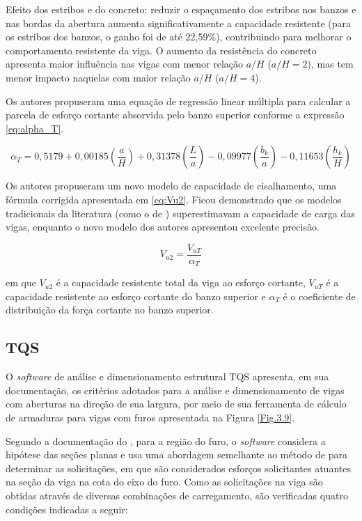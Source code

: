 Efeito dos estribos e do concreto: reduzir o espaçamento dos estribos nos banzos e nas bordas da abertura aumenta significativamente a capacidade resistente (para os estribos dos banzos, o ganho foi de até 22,59\%), contribuindo para melhorar o comportamento resistente da viga. O aumento da resistência do concreto apresenta maior influência nas vigas com menor relação $a/H$ ($a/H = 2$), mas tem menor impacto naquelas com maior relação $a/H$ ($a/H = 4$).

Os autores propuseram uma equação de regressão linear múltipla para calcular a parcela de esforço cortante absorvida pelo banzo superior conforme a expressão \ref{eq:alpha_T}.

\begin{equation}
\label{eq:alpha_T}
\alpha_T = 0,5179 + 0,00185\left(\frac{a}{H}\right)
+ 0,31378\left(\frac{L}{a}\right)
- 0,09977\left(\frac{b_k}{a}\right)
- 0,11653\left(\frac{h_k}{H}\right)
\end{equation}

Os autores propuseram um novo modelo de capacidade de cisalhamento, uma fórmula corrigida apresentada em \ref{eq:Vu2}. Ficou demonstrado que os modelos tradicionais da literatura (como o de ) superestimavam a capacidade de carga das vigas, enquanto o novo modelo dos autores apresentou excelente precisão.

\begin{equation}
\label{eq:Vu2}
V_{u2} = \frac{V_{uT}}{\alpha_T}
\end{equation}

em que $V_{u2}$ é a capacidade resistente total da viga ao esforço cortante, $V_{uT}$ é a capacidade resistente ao esforço cortante do banzo superior e $\alpha_T$ é o coeficiente de distribuição da força cortante no banzo superior.

\subsection{TQS}

O \textit{software} de análise e dimensionamento estrutural TQS apresenta, em sua documentação, os critérios adotados para a análise e dimensionamento de vigas com aberturas na direção de sua largura, por meio de sua ferramenta de cálculo de armaduras para vigas com furos apresentada na Figura \ref{Fig.3.9}.

Segundo a documentação do , para a região do furo, o \textit{software} considera a hipótese das seções planas e usa uma abordagem semelhante ao método de  para determinar as solicitações, em que são considerados esforços solicitantes atuantes na seção da viga na cota do eixo do furo. Como as solicitações na viga são obtidas através de diversas combinações de carregamento, são verificadas quatro condições indicadas a seguir:

